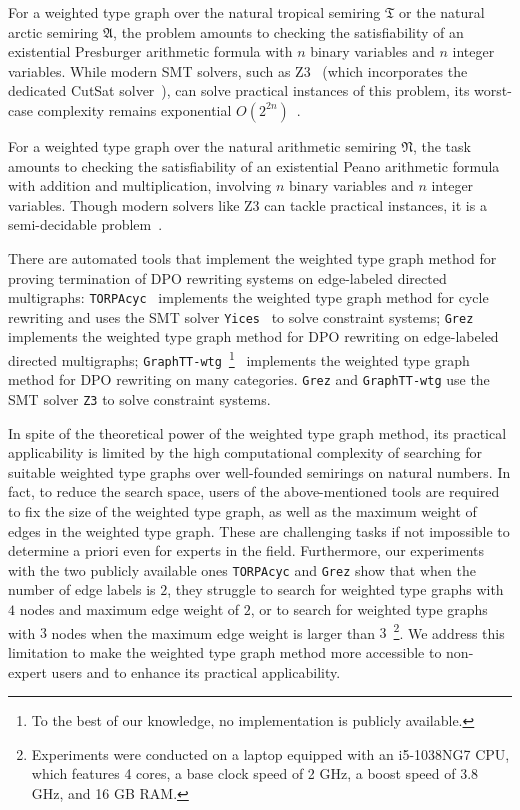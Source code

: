     For a weighted type graph over the natural tropical semiring $\mathfrak{T}$ or the natural arctic semiring $\mathfrak{A}$, the problem amounts to
    checking the satisfiability of an existential Presburger arithmetic formula with $n$ binary variables and $n$ integer variables.
    While modern SMT solvers, such as Z3~\cite{de2008z3} (which incorporates the dedicated CutSat solver~\cite{z3ilp_cutsat}), can solve practical instances of this problem, its worst-case complexity remains exponential \( O(2^{2n}) \)~\cite{arithmetic2024z3}.

     For a weighted type graph over the natural arithmetic semiring $\mathfrak{N}$, the task amounts to
     checking the satisfiability of an existential Peano arithmetic formula with addition and multiplication, involving $n$ binary variables and $n$ integer variables. Though modern solvers like Z3 can tackle practical instances, it is a semi-decidable problem~\cite{matiyasevivc2003enumerable}.

    There are automated tools that implement the weighted type graph method for proving termination of DPO rewriting systems on edge-labeled directed multigraphs:  
    \texttt{TORPAcyc}~\cite{TORPAcyc} implements the weighted type graph method for cycle rewriting and uses the SMT solver \texttt{Yices}~\cite{yices} to solve constraint systems;
    \texttt{Grez}~\cite{grez} implements the weighted type graph method for DPO rewriting on edge-labeled directed multigraphs; \texttt{GraphTT-wtg}~\footnote{To the best of our knowledge, no implementation is publicly available.}~\cite{endrullis2024generalized_arxiv_v3} implements the weighted type graph method for DPO rewriting on many categories.
    \texttt{Grez} and \texttt{GraphTT-wtg}  
    use  the SMT solver \texttt{Z3} to solve constraint systems.

    In spite of the theoretical power of the weighted type graph method, its practical applicability is limited by the high computational complexity of searching for suitable weighted type graphs over well-founded semirings on 
    natural numbers. In fact, to reduce the search space, users of the above-mentioned tools are required
     to fix the size of the weighted type graph, as well as the maximum weight of edges in the weighted type graph. These are challenging tasks if not impossible to determine a priori even for experts in the field. 
    Furthermore, our experiments with the two publicly available ones \texttt{TORPAcyc} and \texttt{Grez} show that when the number of edge labels is $2$, they struggle to search for weighted type graphs with $4$ nodes and maximum edge weight of $2$, or to search for weighted type graphs with $3$ nodes when the maximum edge weight is larger than $3$~\footnote{Experiments were conducted on a laptop equipped with an i5-1038NG7 CPU, which features 4 cores, a base clock speed of 2 GHz, a boost speed of 3.8 GHz, and 16 GB RAM.}. 
   We address this limitation to make the weighted type graph method more accessible to non-expert users and to enhance its practical applicability.

